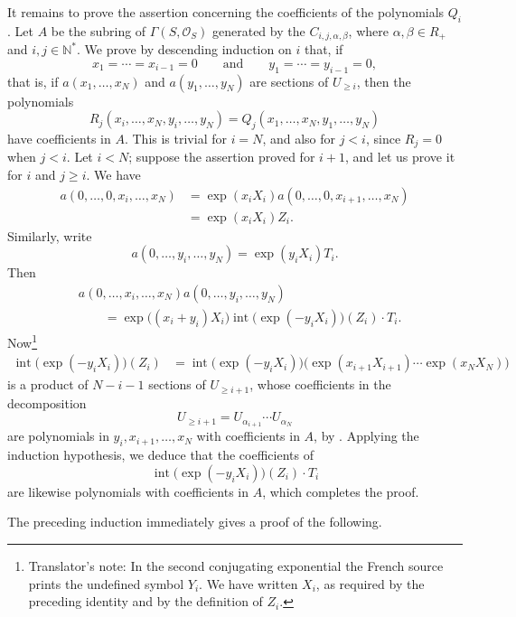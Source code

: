 It remains to prove the assertion concerning the coefficients of the
polynomials \(Q_i\). Let \(A\) be the subring of
\(\Gamma(S,\mathcal O_S)\) generated by the
\(C_{i,j,\alpha,\beta}\), where
\(\alpha,\beta\in R_+\) and \(i,j\in\mathbb N^*\).
We prove by descending induction on \(i\) that, if
\[
  x_1=\cdots=x_{i-1}=0
  \qquad\text{and}\qquad
  y_1=\cdots=y_{i-1}=0,
\]
that is, if \(a(x_1,\ldots,x_N)\) and \(a(y_1,\ldots,y_N)\)
are sections of \(U_{\geq i}\), then the polynomials
\[
  R_j(x_i,\ldots,x_N,y_i,\ldots,y_N)
  =
  Q_j(x_1,\ldots,x_N,y_1,\ldots,y_N)
\]
have coefficients in \(A\). This is trivial for \(i=N\), and
also for \(j<i\), since \(R_j=0\) when \(j<i\). Let \(i<N\);
suppose the assertion proved for \(i+1\), and let us prove it
for \(i\) and \(j\geq i\). We have
\[
\begin{split}
  a(0,\ldots,0,x_i,\ldots,x_N)
  &=
  \exp(x_iX_i)
  a(0,\ldots,0,x_{i+1},\ldots,x_N)\\
  &=
  \exp(x_iX_i)Z_i.
\end{split}
\]
Similarly, write
\[
  a(0,\ldots,y_i,\ldots,y_N)=\exp(y_iX_i)T_i.
\]
Then
\[
\begin{split}
  &a(0,\ldots,x_i,\ldots,x_N)
   a(0,\ldots,y_i,\ldots,y_N)\\
  &\qquad =
  \exp\bigl((x_i+y_i)X_i\bigr)
  \operatorname{int}\bigl(\exp(-y_iX_i)\bigr)(Z_i)\cdot T_i.
\end{split}
\]
Now\footnote{Translator's note: In the second conjugating exponential
the French source prints the undefined symbol \(Y_i\). We have
written \(X_i\), as required by the preceding identity and by the
definition of \(Z_i\).}
\[
\begin{split}
  \operatorname{int}\bigl(\exp(-y_iX_i)\bigr)(Z_i)
  &=
  \operatorname{int}\bigl(\exp(-y_iX_i)\bigr)
  \bigl(
    \exp(x_{i+1}X_{i+1})\cdots\exp(x_NX_N)
  \bigr)
\end{split}
\]
is a product of \(N-i-1\) sections of \(U_{\geq i+1}\), whose
coefficients in the decomposition
\[
  U_{\geq i+1}
  =
  U_{\alpha_{i+1}}\cdots U_{\alpha_N}
\]
are polynomials in \(y_i,x_{i+1},\ldots,x_N\) with coefficients
in \(A\), by . Applying the induction hypothesis, we deduce
that the coefficients of
\[
  \operatorname{int}\bigl(\exp(-y_iX_i)\bigr)(Z_i)\cdot T_i
\]
are likewise polynomials with coefficients in \(A\), which
completes the proof.

The preceding induction immediately gives a proof of the following.

